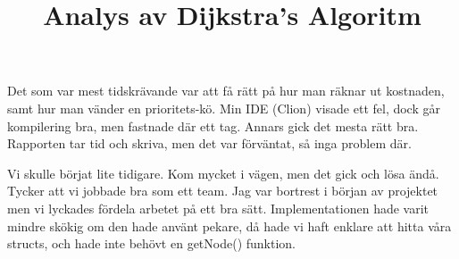 \documentclass[fleqn,10pt]{article}
\begin{document}
\title{Analys av Dijkstra's Algoritm}

Det som var mest tidskrävande var att få rätt på hur man räknar ut kostnaden, samt hur man vänder en prioritets-kö.
Min IDE (Clion) visade ett fel, dock går kompilering bra, men fastnade där ett tag.
Annars gick det mesta rätt bra.
Rapporten tar tid och skriva, men det var förväntat, så inga problem där.

Vi skulle börjat lite tidigare.
Kom mycket i vägen, men det gick och lösa ändå.
Tycker att vi jobbade bra som ett team.
Jag var bortrest i början av projektet men vi lyckades fördela arbetet på ett bra sätt.
Implementationen hade varit mindre skökig om den hade använt pekare, då hade vi haft enklare att hitta våra structs, och hade inte behövt en getNode() funktion.
\end{document}
